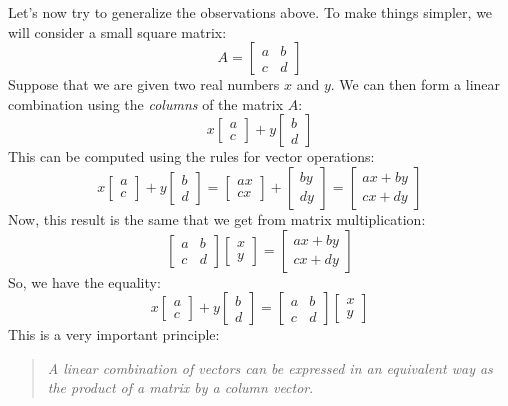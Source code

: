 \documentclass[12pt]{article}
\begin{document}
Let's now try to generalize the observations above. To make things simpler, we will consider a small square matrix:
\[
A=\begin{bmatrix}a&b\\c&d\end{bmatrix}
\]
Suppose that we are given two real numbers $x$ and $y$. We can then form a linear combination using the \emph{columns} of the matrix $A$:
\[
x\begin{bmatrix}a\\c\end{bmatrix}+y\begin{bmatrix} b\\d\end{bmatrix}
\]
This can be computed using the rules for vector operations:
\[
x\begin{bmatrix}a\\c\end{bmatrix}+y\begin{bmatrix} b\\d\end{bmatrix}=
\begin{bmatrix}ax\\cx\end{bmatrix}+\begin{bmatrix} by\\dy\end{bmatrix}=
\begin{bmatrix}ax+by\\cx+dy\end{bmatrix}
\]
Now, this result is the same that we get from matrix multiplication:
\[
\begin{bmatrix}a&b\\c&d\end{bmatrix}
\begin{bmatrix}x\\y\end{bmatrix}=
\begin{bmatrix}ax+by\\cx+dy\end{bmatrix}
\]
So, we have the equality:
\[
x\begin{bmatrix}a\\c\end{bmatrix}+y\begin{bmatrix} b\\d\end{bmatrix}=
\begin{bmatrix}a&b\\c&d\end{bmatrix}
\begin{bmatrix}x\\y\end{bmatrix}
\]
This is a very important principle:
\begin{quote}
\emph{A linear combination of vectors can be expressed in an equivalent way as the product of a matrix by a column vector}.
\end{quote}
\end{document}
